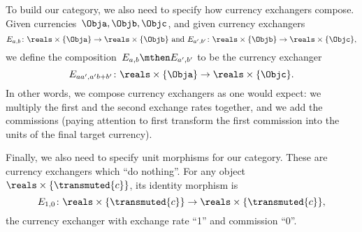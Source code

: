 
To build our category, we also need to specify how currency exchangers compose. Given currencies~$\Obja, \Objb, \Objc$, and given currency exchangers
\begin{equation*}
  E_{a,b} \colon \reals \times \{\Obja \} \to \reals \times \{ \Objb\}
   \text{ and }
  E_{a',b'} \colon \reals \times \{\Objb\} \to \reals \times \{\Objc\},
\end{equation*}
we define the composition~$E_{a,b} \mthen E_{a',b'}$ to be the currency exchanger
\begin{equation}
  \label{eq:comp-law-curr}
  E_{aa',a'b + b'} \colon \reals \times \{\Obja \} \to \reals \times \{\Objc\}.
\end{equation}
In other words, we compose currency exchangers as one would expect: we multiply the first and the second exchange rates together, and we add the commissions (paying attention to first transform the first commission into the units of the final target currency).

Finally, we also need to specify unit morphisms for our category. These are currency exchangers which ``do nothing''. For any object~$\reals \times \{ \transmuted{c}\}$, its identity morphism is
\begin{equation*}
  E_{1,0} \colon \reals \times \{\transmuted{c}\} \to \reals \times \{\transmuted{c}\},
\end{equation*}
the currency exchanger with exchange rate ``1'' and commission ``0''.

